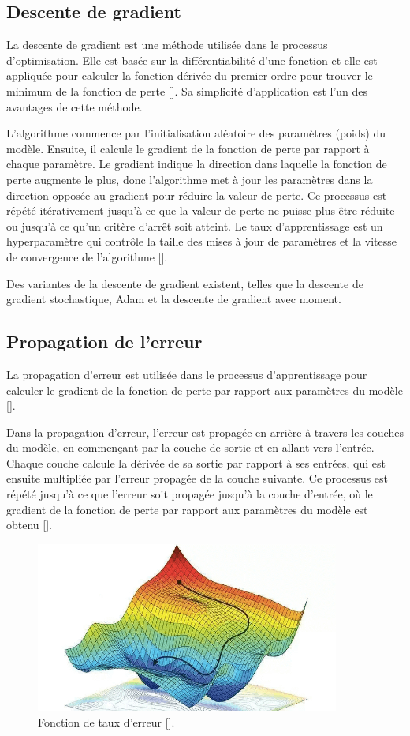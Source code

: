 \subsection{Descente de gradient}
La descente de gradient est une méthode utilisée dans le processus
d’optimisation. Elle est basée sur la différentiabilité d’une fonction et elle
est appliquée pour calculer la fonction dérivée du premier ordre pour trouver
le minimum de la fonction de perte [\cite{Goodfellow-et-al-2016}]. Sa
simplicité d’application est l’un des avantages de cette méthode.

L'algorithme commence par l'initialisation aléatoire des paramètres (poids) du
modèle. Ensuite, il calcule le gradient de la fonction de perte par rapport à
chaque paramètre. Le gradient indique la direction dans laquelle la fonction de
perte augmente le plus, donc l'algorithme met à jour les paramètres dans la
direction opposée au gradient pour réduire la valeur de perte. Ce processus est
répété itérativement jusqu'à ce que la valeur de perte ne puisse plus être
réduite ou jusqu'à ce qu'un critère d'arrêt soit atteint. Le taux
d'apprentissage est un hyperparamètre qui contrôle la taille des mises à jour
de paramètres et la vitesse de convergence de l'algorithme
[\cite{Goodfellow-et-al-2016}].

Des variantes de la descente de gradient existent, telles que la descente de
gradient stochastique, Adam et la descente de gradient avec moment.

\subsection{Propagation de l’erreur}
La propagation d'erreur est utilisée dans le processus d'apprentissage pour
calculer le gradient de la fonction de perte par rapport aux paramètres du
modèle [\cite{Goodfellow-et-al-2016}].

Dans la propagation d'erreur, l'erreur est propagée en arrière à travers les
couches du modèle, en commençant par la couche de sortie et en allant vers
l'entrée. Chaque couche calcule la dérivée de sa sortie par rapport à ses
entrées, qui est ensuite multipliée par l'erreur propagée de la couche
suivante. Ce processus est répété jusqu'à ce que l'erreur soit propagée jusqu'à
la couche d'entrée, où le gradient de la fonction de perte par rapport aux
paramètres du modèle est obtenu [\cite{Goodfellow-et-al-2016}].

\begin{figure}[hbt!]
	\centering
	\includegraphics[width=10cm]{images_pfe/gd.png}
	\caption{Fonction de taux d’erreur [\cite{amini2018spatial}].}
	\label{fig:error-function}
\end{figure}
\FloatBarrier
\medskip

